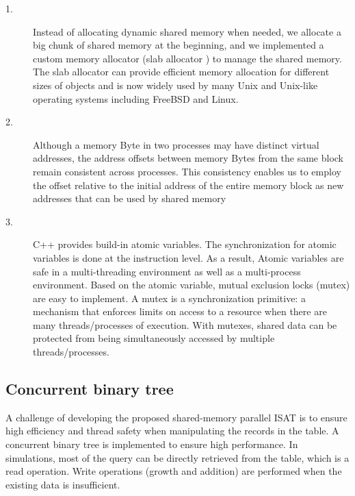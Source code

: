 \begin{description}
      \item [1.] Instead of allocating dynamic shared memory when needed, we allocate a big chunk of shared memory at the beginning, and we implemented a custom memory allocator (slab allocator \cite{bonwick1994slab}) to manage the shared memory. The slab allocator can provide efficient memory allocation for different sizes of objects and is now widely used by many Unix and Unix-like operating systems including FreeBSD and Linux. 
      \item [2.] Although a memory Byte in two processes may have distinct virtual addresses, the address offsets between memory Bytes from the same block remain consistent across processes. This consistency enables us to employ the offset relative to the initial address of the entire memory block as new addresses that can be used by shared memory
      \item [3.] C++ provides build-in atomic variables. The synchronization for atomic variables is done at the instruction level. As a result, Atomic variables are safe in a multi-threading environment as well as a multi-process environment.
Based on the atomic variable, mutual exclusion locks (mutex) are easy to implement. A mutex is a synchronization primitive: a mechanism that enforces limits on access to a resource when there are many threads/processes of execution. With mutexes, shared data can be protected from being simultaneously accessed by multiple threads/processes.
      
    \end{description}

%



\subsection{Concurrent binary tree}
A challenge of developing the proposed shared-memory parallel ISAT is to ensure high efficiency and thread safety when manipulating the records in the table. A concurrent binary tree is implemented to ensure high performance. In simulations, most of the query can be directly retrieved from the table, which is a read operation.
Write operations (growth and addition) are performed when the existing data is insufficient. %

